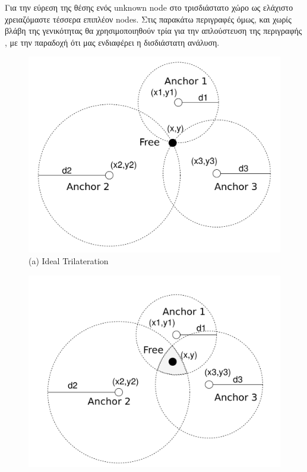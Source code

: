 Για την εύρεση της θέσης ενός unknown node στο τρισδιάστατο χώρο ως ελάχιστο χρειαζόμαστε τέσσερα επιπλέον nodes.
Στις παρακάτω περιγραφές όμως, και χωρίς βλάβη της γενικότητας θα χρησιμοποιηθούν τρία για την απλούστευση της περιγραφής , με την παραδοχή ότι μας
ενδιαφέρει η δισδιάστατη ανάλυση.

\begin{figure} [H]
	\centering
	
		\begin{minipage}{.33\textwidth}
			\centering
			\includegraphics[width=\linewidth]{../Photos/Trilateration-ideal.png}
			{(a) Ideal Trilateration}
		\end{minipage}%
		\begin{minipage}{.33\textwidth}
			\centering
			\includegraphics[width=\linewidth]{../Photos/Trilateration-actual.png}

\end{minipage}
\end{figure}
